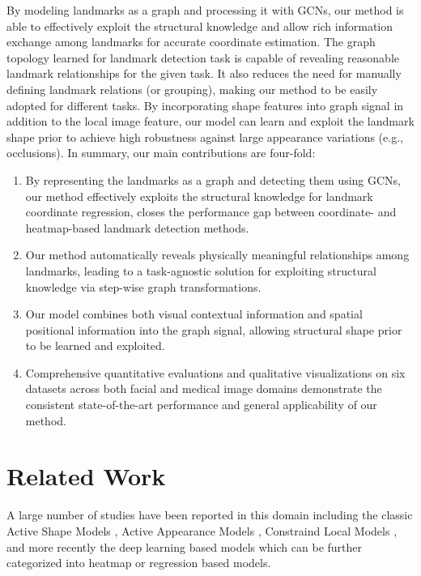 \documentclass[runningheads]{llncs}
\begin{document}
By modeling landmarks as a graph and processing it with GCNs, our method is able to effectively exploit the structural knowledge and allow rich information exchange among landmarks for accurate coordinate estimation. The graph topology learned for landmark detection task is capable of revealing reasonable landmark relationships for the given task. It also reduces the need for manually defining landmark relations (or grouping), making our method to be easily adopted for different tasks. By incorporating shape features into graph signal in addition to the local image feature, our model can learn and exploit the landmark shape prior to achieve high robustness against large appearance variations (e.g., occlusions). 
In summary, our main contributions are four-fold: 
\begin{enumerate}
  \item By representing the landmarks as a graph and detecting them using GCNs, our method effectively exploits the structural knowledge for landmark coordinate regression, closes the performance gap between coordinate- and heatmap-based landmark detection methods.
  \item Our method automatically reveals physically meaningful relationships among landmarks, leading to a task-agnostic solution for exploiting structural knowledge via step-wise graph transformations.
  \item Our model combines both visual contextual information and spatial positional information into the graph signal, allowing structural shape prior to be learned and exploited.
  \item Comprehensive quantitative evaluations and qualitative visualizations on six datasets across both facial and medical image domains demonstrate the consistent state-of-the-art performance and general applicability of our method.
\end{enumerate}




\section{Related Work}
A large number of studies have been reported in this domain including the classic Active Shape Models \cite{milborrow2008locating,cootes1995active,cootes1992active}, Active Appearance Models \cite{cootes2001active,sauer2011accurate,liu2007generic}, Constraind Local Models \cite{cristinacce2006feature,asthana2013robust,saragih2009face,lindner2014robust}, and more recently the deep learning based models which can be further categorized into heatmap or regression based models.
\end{document}
